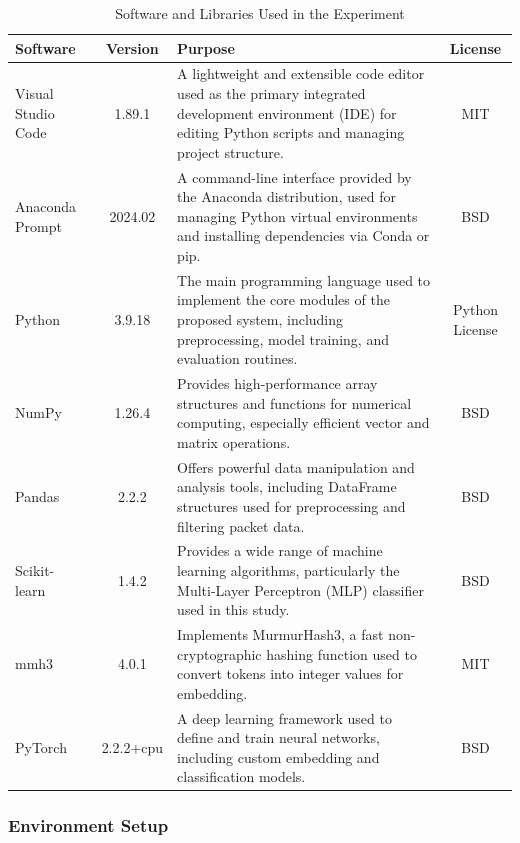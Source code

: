\begin{ZhChapter}
    \begin{table}[htbp]
    \centering
    \caption{Software and Libraries Used in the Experiment}
    \label{tab:software}
    \begin{tabular}{|l|c|p{7cm}|c|}
    \hline
    \textbf{Software} & \textbf{Version} & \textbf{Purpose} & \textbf{License} \\ \hline
    Visual Studio Code~\cite{vscode} & 1.89.1 & A lightweight and extensible code editor used as the primary integrated development environment (IDE) for editing Python scripts and managing project structure. & MIT \\ \hline
    Anaconda Prompt~\cite{anaconda} & 2024.02 & A command-line interface provided by the Anaconda distribution, used for managing Python virtual environments and installing dependencies via Conda or pip. & BSD \\ \hline
    Python~\cite{python} & 3.9.18 & The main programming language used to implement the core modules of the proposed system, including preprocessing, model training, and evaluation routines. & Python License \\ \hline
    NumPy~\cite{numpy} & 1.26.4 & Provides high-performance array structures and functions for numerical computing, especially efficient vector and matrix operations. & BSD \\ \hline
    Pandas~\cite{pandas} & 2.2.2 & Offers powerful data manipulation and analysis tools, including DataFrame structures used for preprocessing and filtering packet data. & BSD \\ \hline
    Scikit-learn~\cite{sklearn} & 1.4.2 & Provides a wide range of machine learning algorithms, particularly the Multi-Layer Perceptron (MLP) classifier used in this study. & BSD \\ \hline
    mmh3~\cite{mmh3} & 4.0.1 & Implements MurmurHash3, a fast non-cryptographic hashing function used to convert tokens into integer values for embedding. & MIT \\ \hline
    PyTorch~\cite{torch} & 2.2.2+cpu & A deep learning framework used to define and train neural networks, including custom embedding and classification models. & BSD \\ \hline
    \end{tabular}
    \end{table}



    \subsubsection{Environment Setup}


\end{ZhChapter}
